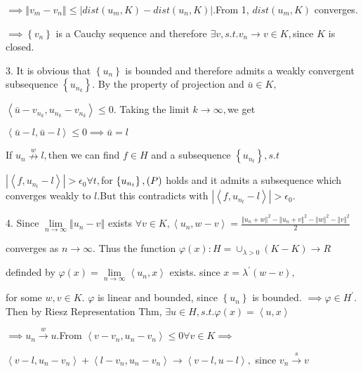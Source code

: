 \documentclass{article}
\begin{document}
$\implies \left\Vert v_{m}-v_{n}\right\Vert \leq \left\vert dist\left(
u_{m},K\right) -dist\left( u_{n},K\right) \right\vert .$From 1, $dist\left(
u_{m},K\right) $ converges.

$\implies \left\{ v_{n}\right\} $ is a Cauchy sequence and therefore $%
\exists v,s.t.v_{n}\rightarrow v\in K,$since $K$ is closed.

3. It is obvious that $\left\{ u_{n}\right\} $ is bounded and therefore
admits a weakly convergent subsequence $\left\{ u_{n_{k}}\right\} $. By the
property of projection and $\bar{u}\in K,$

$\left\langle \bar{u}-v_{n_{k}},u_{n_{k}}-v_{n_{k}}\right\rangle \leq 0.$
Taking the limit $k\rightarrow \infty ,$we get

$\left\langle \bar{u}-l,\bar{u}-l\right\rangle \leq 0\implies \bar{u}=l$

If $u_{n}\overset{w}{\nrightarrow }l,$then we can find $f\in H$ and a
subsequence $\left\{ u_{n_{t}}\right\} ,s.t$

$\left\vert \left\langle f,u_{n_{t}}-l\right\rangle \right\vert >\epsilon
_{0}\forall t,$for $\bigskip \left\{ u_{n_{t}}\right\} ,\left( P\right) $
holds and it admits a subsequence which converges weakly to $l.$But this
contradicts with $\left\vert \left\langle f,u_{n_{t}}-l\right\rangle
\right\vert >\epsilon _{0}.$

4. Since $\underset{n\rightarrow \infty }{\lim }\left\Vert
u_{n}-v\right\Vert $ exists $\forall v\in K,\left\langle
u_{n},w-v\right\rangle =\frac{\left\Vert u_{n}+w\right\Vert ^{2}-\left\Vert
u_{n}+v\right\Vert ^{2}-\left\Vert w\right\Vert ^{2}-\left\Vert v\right\Vert
^{2}}{2}$ 

converges as $n\rightarrow \infty .$ Thus the function $\varphi \left(
x\right) :H=\cup _{\lambda >0}\left( K-K\right) \rightarrow R$

definded by $\varphi \left( x\right) =\underset{n\rightarrow \infty }{\lim }%
\left\langle u_{n},x\right\rangle $ exists. since $x=\lambda ^{\prime
}\left( w-v\right) ,$

for some $w,v\in K.$ $\varphi $ is linear and bounded, since $\left\{
u_{n}\right\} $ is bounded. $\implies \varphi \in H^{\prime }.$Then by Riesz
Representation Thm, $\exists u\in H,s.t.\varphi \left( x\right)
=\left\langle u,x\right\rangle $

$\implies u_{n}\overset{w}{\rightarrow }u.$From $\left\langle
v-v_{n},u_{n}-v_{n}\right\rangle \leq 0\forall v\in K\implies $

$\left\langle v-l,u_{n}-v_{n}\right\rangle +\left\langle
l-v_{n},u_{n}-v_{n}\right\rangle \rightarrow \left\langle
v-l,u-l\right\rangle ,$ since $v_{n}\overset{s}{\rightarrow }v$
\end{document}
